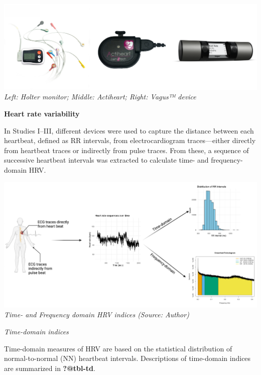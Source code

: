 \documentclass[
  a4paper,
  headsepline=true,
  open=any]{scrbook}
\begin{document}
\includegraphics{images/can_tools.pdf} \emph{Left: Holter monitor;
Middle: Actiheart; Right: Vagus™ device}

\textbf{Heart rate variability}

In Studies I--III, different devices were used to capture the distance
between each heartbeat, defined as RR intervals, from electrocardiogram
traces---either directly from heartbeat traces or indirectly from pulse
traces. From these, a sequence of successive heartbeat intervals was
extracted to calculate time- and frequency-domain HRV.

\includegraphics{images/measurements_hrv.pdf} \emph{Time- and Frequency
domain HRV indices (Source: Author)}

\emph{Time-domain indices}

Time-domain measures of HRV are based on the statistical distribution of
normal-to-normal (NN) heartbeat intervals. Descriptions of time-domain
indices are summarized in \textbf{?@tbl-td}.
\end{document}
